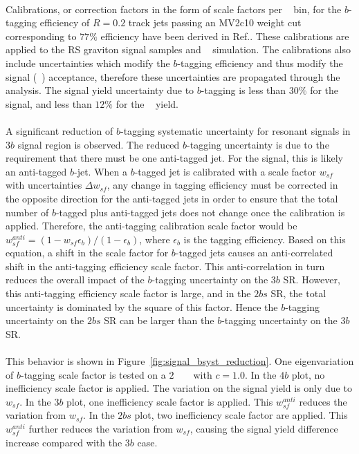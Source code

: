 \paragraph{}
Calibrations, or correction factors in the form of scale factors per \pt~ bin, for the $b$-tagging efficiency of $R=0.2$ track jets passing an MV2c10 weight cut corresponding to $77\%$ efficiency have been derived in Ref.\cite{ATL-COM-PHYS-2015-009, ATL-COM-PHYS-2015-1323}.  
These calibrations are applied to the RS graviton signal samples and \ttbar~ simulation.  
The calibrations also include uncertainties which modify the $b$-tagging efficiency and thus modify the signal (\ttbar~) acceptance, therefore these uncertainties are propagated through the analysis.
The signal yield uncertainty due to $b$-tagging is less than $30\%$ for the signal, and less than $12\%$ for the \ttbar~ yield.

\paragraph{}
A significant reduction of $b$-tagging systematic uncertainty for resonant signals in $3b$ signal region is observed. 
The reduced $b$-tagging uncertainty is due to the requirement that there must be one anti-tagged jet.
For the signal, this is likely an anti-tagged $b$-jet.
When a $b$-tagged jet is calibrated with a scale factor $w_{sf}$ with uncertainties $\Delta w_{sf}$, any change in tagging efficiency must be corrected in the opposite direction for the anti-tagged jets in order to ensure that the total number of $b$-tagged plus anti-tagged jets does not change once the calibration is applied. 
Therefore, the anti-tagging calibration scale factor would be $w_{sf}^{anti} = (1 - w_{sf} \epsilon_{b}) / (1 - \epsilon_{b}) $, where $\epsilon_{b}$ is the tagging efficiency. 
Based on this equation, a shift in the scale factor for $b$-tagged jets causes an anti-correlated shift in the anti-tagging efficiency scale factor. 
This anti-correlation in turn reduces the overall impact of the $b$-tagging uncertainty on the $3b$ SR. 
However, this anti-tagging efficiency scale factor is large, and in the $2bs$ SR, the total uncertainty is dominated by the square of this factor. 
Hence the $b$-tagging uncertainty on the $2bs$ SR can be larger than the $b$-tagging uncertainty on the $3b$ SR.

\paragraph{}
This behavior is shown in Figure~\ref{fig:signal_bsyst_reduction}.
One eigenvariation of $b$-tagging scale factor is tested on a $2$ \TeV~ \Grav~ with $c=1.0$.
In the $4b$ plot, no inefficiency scale factor is applied. 
The variation on the signal yield is only due to $w_{sf}$.
In the $3b$ plot, one inefficiency scale factor is applied. 
This $w_{sf}^{anti}$ reduces the variation from $w_{sf}$.
In the $2bs$ plot, two inefficiency scale factor are applied. 
This $w_{sf}^{anti}$ further reduces the variation from $w_{sf}$, causing the signal yield difference increase compared with the $3b$ case.


